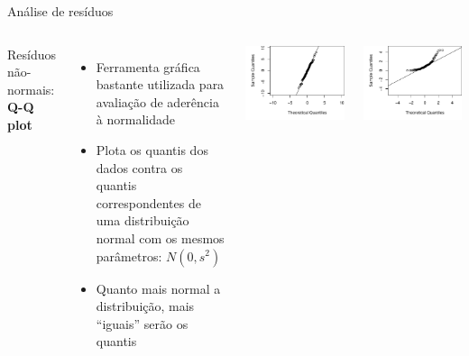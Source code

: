 \documentclass{beamer}\usepackage[]{graphicx}\usepackage[]{color}
\newenvironment{knitrout}{}{} %
\renewenvironment{knitrout}{\setlength{\topsep}{0mm}}{}
\begin{document}
\begin{frame}{Análise de resíduos}

\begin{columns}[c]

\small

Resíduos não-normais: \textbf{Q-Q plot}
\begin{itemize}
\item Ferramenta gráfica bastante utilizada para avaliação de aderência à normalidade \pause
\item Plota os quantis dos dados contra os quantis correspondentes de uma distribuição normal com os mesmos parâmetros: $N(0, s^2)$ \pause
\item Quanto mais normal a distribuição, mais ``iguais'' serão os quantis \pause
\end{itemize}


\begin{knitrout}
\color{fgcolor}
\includegraphics[width=1\linewidth]{figure/r5-1} 

\includegraphics[width=1\linewidth]{figure/r5-2} 


\end{knitrout}
\end{columns}
\end{frame}
\end{document}
